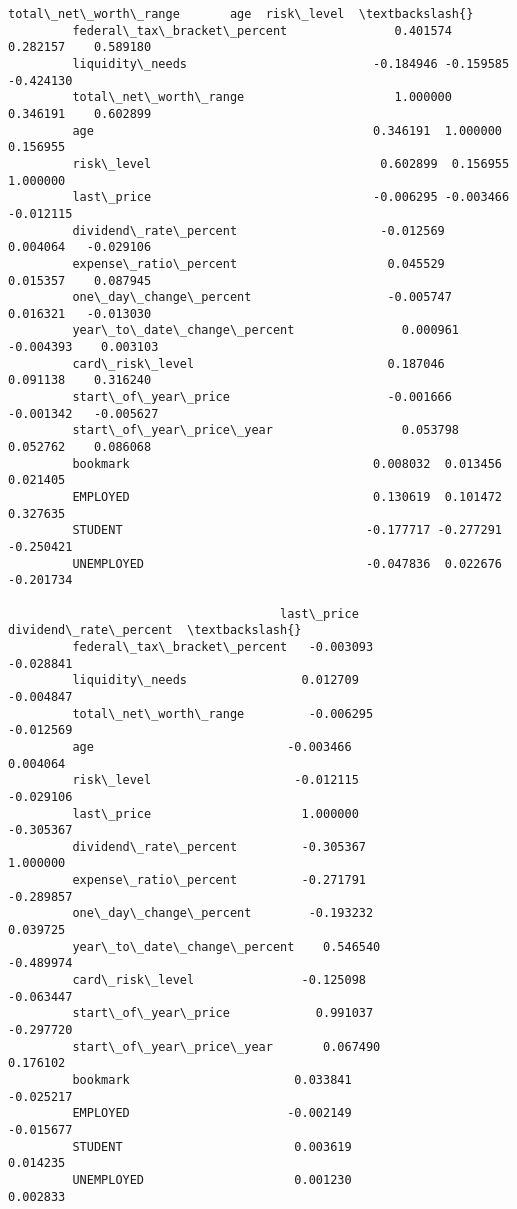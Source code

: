 \documentclass[11pt]{article}
\begin{document}
\begin{Verbatim}[commandchars=\\\{\}]
                                      total\_net\_worth\_range       age  risk\_level  \textbackslash{}
         federal\_tax\_bracket\_percent               0.401574  0.282157    0.589180   
         liquidity\_needs                          -0.184946 -0.159585   -0.424130   
         total\_net\_worth\_range                     1.000000  0.346191    0.602899   
         age                                       0.346191  1.000000    0.156955   
         risk\_level                                0.602899  0.156955    1.000000   
         last\_price                               -0.006295 -0.003466   -0.012115   
         dividend\_rate\_percent                    -0.012569  0.004064   -0.029106   
         expense\_ratio\_percent                     0.045529  0.015357    0.087945   
         one\_day\_change\_percent                   -0.005747  0.016321   -0.013030   
         year\_to\_date\_change\_percent               0.000961 -0.004393    0.003103   
         card\_risk\_level                           0.187046  0.091138    0.316240   
         start\_of\_year\_price                      -0.001666 -0.001342   -0.005627   
         start\_of\_year\_price\_year                  0.053798  0.052762    0.086068   
         bookmark                                  0.008032  0.013456    0.021405   
         EMPLOYED                                  0.130619  0.101472    0.327635   
         STUDENT                                  -0.177717 -0.277291   -0.250421   
         UNEMPLOYED                               -0.047836  0.022676   -0.201734   
         
                                      last\_price  dividend\_rate\_percent  \textbackslash{}
         federal\_tax\_bracket\_percent   -0.003093              -0.028841   
         liquidity\_needs                0.012709              -0.004847   
         total\_net\_worth\_range         -0.006295              -0.012569   
         age                           -0.003466               0.004064   
         risk\_level                    -0.012115              -0.029106   
         last\_price                     1.000000              -0.305367   
         dividend\_rate\_percent         -0.305367               1.000000   
         expense\_ratio\_percent         -0.271791              -0.289857   
         one\_day\_change\_percent        -0.193232               0.039725   
         year\_to\_date\_change\_percent    0.546540              -0.489974   
         card\_risk\_level               -0.125098              -0.063447   
         start\_of\_year\_price            0.991037              -0.297720   
         start\_of\_year\_price\_year       0.067490               0.176102   
         bookmark                       0.033841              -0.025217   
         EMPLOYED                      -0.002149              -0.015677   
         STUDENT                        0.003619               0.014235   
         UNEMPLOYED                     0.001230               0.002833   
         

\end{Verbatim}
\end{document}
